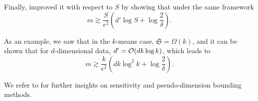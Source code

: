 Finally, \cite{braverman2016coresetsota} improved it with respect to $S$ by showing that under the same framework
\begin{equation*}
	m \gtrsim \frac{S}{\epsilon^{2}} (d' \log S + \log \frac{2}{\delta}).
\end{equation*}


As an example, we saw that in the $k$-means case, $\mathfrak{S} = \Omega(k)$, and it can be shown that for $d$-dimensional data, ${d'} = \mathcal{O}(dk\log k)$, which leads to
\begin{equation*}
    m \gtrsim \frac{k}{\epsilon^{2}} (dk \log^2 k + \log \frac{2}{\delta}).
\end{equation*}

We refer to \cite{bachem2017coresetML} for further insights on sensitivity and pseudo-dimension bounding methods.
